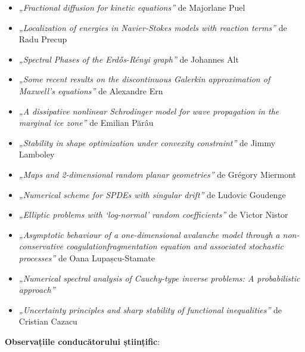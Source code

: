 \begin{itemize}
    \item \emph{„Fractional diffusion for kinetic equations”} de Majorlane Puel

    \item \emph{„Localization of energies in Navier-Stokes models with reaction terms”} de Radu Precup

    \item \emph{„Spectral Phases of the Erdős-Rényi graph”} de Johannes Alt

    \item \emph{„Some recent results on the discontinuous Galerkin approximation of Maxwell’s equations”} de Alexandre Ern

    \item \emph{„A dissipative nonlinear Schrodinger model for wave propagation in the marginal ice zone”} de Emilian Părâu

    \item \emph{„Stability in shape optimization under convexity constraint”} de Jimmy Lamboley

    \item \emph{„Maps and 2-dimensional random planar geometries”} de Grégory Miermont

    \item \emph{„Numerical scheme for SPDEs with singular drift”} de Ludovic Goudenge
    
    \item \emph{„Elliptic problems with ‘log-normal’ random coefficients”} de Victor Nistor
    
    \item \emph{„Asymptotic behaviour of a one-dimensional avalanche model through a non-conservative coagulationfragmentation equation and associated stochastic processes”} de Oana Lupașcu-Stamate

    \item \emph{„Numerical spectral analysis of Cauchy-type inverse problems: A probabilistic approach”}

    \item \emph{„Uncertainty principles and sharp stability of functional inequalities”} de Cristian Cazacu
\end{itemize}

\vspace{0.5em}

\textbf{Observațiile conducătorului științific}:

\vspace{3em}

